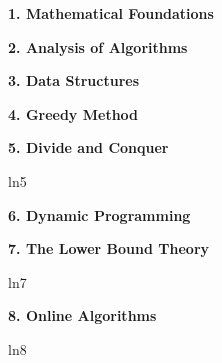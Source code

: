 \documentclass[8pt]{minimal}
\begin{document}
\begin{flushleft}
\begin{multicols}{3}


    \textbf{1. Mathematical Foundations}
    

    \textbf{2. Analysis of Algorithms}
    

    \textbf{3. Data Structures}

    
    \textbf{4. Greedy Method}
    


    \textbf{5. Divide and Conquer}

    ln5


    \textbf{6. Dynamic Programming}
    

    \textbf{7. The Lower Bound Theory}

    ln7


    \textbf{8. Online Algorithms}

    ln8
    

    \lipsum
    \lipsum

\end{multicols}
\end{flushleft}
\end{document}
